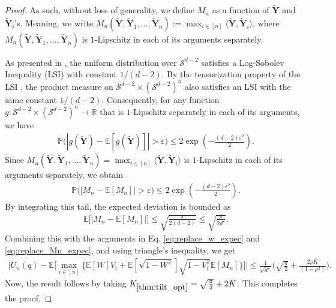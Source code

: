 \documentclass[12pt]{article}
\theoremstyle{definition}
\theoremstyle{remark}
\begin{document}
\begin{proof}
As such, without loss of generality, we  define $M_n$ as a function of $\tilde{\mathbf{Y}}$ and $\tilde{\mathbf{Y}}_i$'s. Meaning, we  write $M_n(\tilde{\mathbf{Y}}, \tilde{\mathbf{Y}}_1, \dots, \tilde{\mathbf{Y}}_n) := \max_{i \in [n]} \langle \tilde{\mathbf{Y}}, \tilde{\mathbf{Y}}_i \rangle$, where $M_n(\tilde{\mathbf{Y}}, \tilde{\mathbf{Y}}_1, \dots, \tilde{\mathbf{Y}}_n)$ is $1$-Lipschitz in each of its arguments separately.

As presented in \citep{ledoux2001concentration, bakry2013analysis}, the uniform distribution over $\mathcal{S}^{d-2}$ satisfies a Log-Sobolev Inequality (LSI) with constant $1/(d-2)$. By the tensorization property of the LSI \cite[Chapter 5]{ledoux2001concentration}, the product measure on $\mathcal{S}^{d-2} \times (\mathcal{S}^{d-2})^n$ also satisfies an LSI with the same constant $1/(d-2)$. Consequently, for any function $g: \mathcal{S}^{d-2} \times (\mathcal{S}^{d-2})^n \rightarrow \mathbb R$ that is $1$-Lipschitz separately in each of its arguments, we have
\begin{align*}
    \mathbb P \big(|g(\tilde{\mathbf{Y}}) - \mathbb E[g(\tilde{\mathbf{Y}})]| > \varepsilon\big) \leq 2 \exp\left( -\frac{(d-2)\varepsilon^2}{2} \right).
\end{align*}
Since $M_n(\tilde{\mathbf{Y}}, \tilde{\mathbf{Y}}_1, \dots, \tilde{\mathbf{Y}}_n) = \max_{i \in [n]} \langle \tilde{\mathbf{Y}}, \tilde{\mathbf{Y}}_i \rangle$ is $1$-Lipschitz in each of its arguments separately, we obtain
\begin{align*}
\mathbb P \big(|M_n - \mathbb{E}[M_n]| > \varepsilon\big) \leq 2 \exp\left( -\frac{(d-2)\varepsilon^2}{2} \right).
\end{align*}
By integrating this tail, the expected deviation is bounded as
\begin{align*}
\mathbb{E}\big[|M_n - \mathbb{E}[M_n]|\big] \leq \sqrt{\frac{\pi}{2(d-2)}} \leq \sqrt{\frac{\pi}{2d^\star}}.
\end{align*}
Combining this with the arguments in Eq. \eqref{eq:replace_w_expec} and \eqref{eq:replace_Mn_expec}, and using triangle's inequality, we get
\begin{align*}
   \Big| U_n(q) - \mathbb E \Big[ \max_{i \in [n]} \big\{ \mathbb{E}[W] V_i + \mathbb{E}[\sqrt{1-W^2}] \sqrt{1-V_i^2} \mathbb E [M_n] \big\} \Big] \Big| \leq \frac{1}{\sqrt{d^\star}} \Big( \sqrt{\frac{\pi}{2}} + \frac{2\rho \bar K}{(1-\rho^2)} \Big).
\end{align*}
Now, the result follows by taking $K_{\ref{thm:tilt_opt}} = \sqrt{\frac{\pi}{2}} + 2\bar K$. This completes the proof.
\end{proof}
\end{document}
